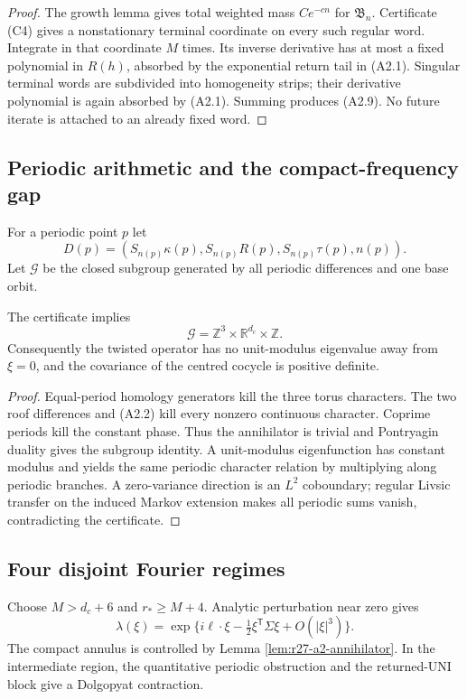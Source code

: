 \begin{proof}
The growth lemma gives total weighted mass $Ce^{-cn}$ for $\mathfrak B_n$.
Certificate (C4) gives a nonstationary terminal coordinate on every such
regular word.  Integrate in that coordinate $M$ times.  Its inverse derivative
has at most a fixed polynomial in $R(h)$, absorbed by the exponential return
tail in (A2.1).  Singular terminal words are subdivided into homogeneity
strips; their derivative polynomial is again absorbed by (A2.1).  Summing
produces (A2.9).  No future iterate is attached to an already fixed word.
\end{proof}

\subsection{Periodic arithmetic and the compact-frequency gap}

For a periodic point $p$ let
\[
 D(p)=(S_{n(p)}\kappa(p),S_{n(p)}R(p),S_{n(p)}\tau(p),n(p)).
\]
Let $\mathscr G$ be the closed subgroup generated by all periodic differences
and one base orbit.

\begin{lemma}
\label{lem:r27-a2-annihilator}
The certificate implies
\[
 \mathscr G=\mathbb Z^3\times\mathbb R^{d_c}\times\mathbb Z.
\]
Consequently the twisted operator has no unit-modulus eigenvalue away from
$\xi=0$, and the covariance of the centred cocycle is positive definite.
\end{lemma}

\begin{proof}
Equal-period homology generators kill the three torus characters.  The two
roof differences and (A2.2) kill every nonzero continuous character.  Coprime
periods kill the constant phase.  Thus the annihilator is trivial and
Pontryagin duality gives the subgroup identity.  A unit-modulus eigenfunction
has constant modulus and yields the same periodic character relation by
multiplying along periodic branches.  A zero-variance direction is an
$L^2$ coboundary; regular Livsic transfer on the induced Markov extension
makes all periodic sums vanish, contradicting the certificate.
\end{proof}

\subsection{Four disjoint Fourier regimes}

Choose $M>d_c+6$ and $r_*\ge M+4$.  Analytic perturbation near zero gives
\[
 \lambda(\xi)
 =\exp\{i\ell\cdot\xi-\tfrac12\xi^\mathsf T\Sigma\xi
        +O(|\xi|^3)\}.                                   \tag{A2.10}
\]
The compact annulus is controlled by Lemma
\ref{lem:r27-a2-annihilator}.  In the intermediate region, the quantitative
periodic obstruction and the returned-UNI block give a Dolgopyat contraction.

